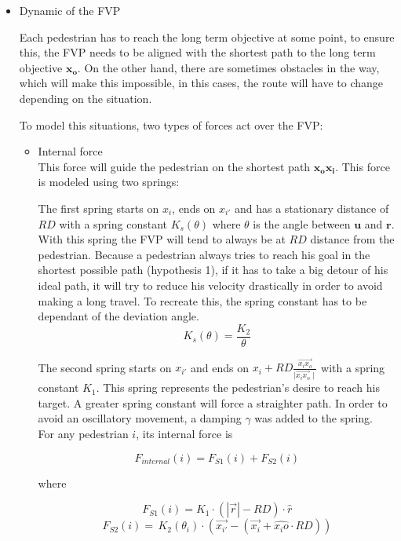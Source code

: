 \documentclass[english]{article}
\begin{document}
\begin{itemize}
\item Dynamic of the FVP

Each pedestrian has to reach the long term objective at some point,
to ensure this, the FVP needs to be aligned with the shortest path
to the long term objective $\mathbf{x_{o}}$. On the other hand, there
are sometimes obstacles in the way, which will make this impossible,
in this cases, the route will have to change depending on the situation.

To model this situations, two types of forces act over the FVP: 
\begin{itemize}
\item Internal force \\

This force will guide the pedestrian on the shortest path $\mathbf{x_{o}x_{i}}$.
This force is modeled using two springs:

The first spring starts on $x_{i}$, ends on $x_{i'}$ and has a stationary
distance of $RD$ with a spring constant $K_{s}(\theta)$ where $\theta$
is the angle between $\mathbf{u}$ and $\mathbf{r}$. With this spring
the FVP will tend to always be at $RD$ distance from the pedestrian.
Because a pedestrian always tries to reach his goal in the shortest
possible path (hypothesis 1), if it has to take a big detour of his
ideal path, it will try to reduce his velocity drastically in order
to avoid making a long travel. To recreate this, the spring constant
has to be dependant of the deviation angle. 
\[
K_{s}(\theta)=\frac{K_{2}}{\theta}
\]

The second spring starts on $x_{i'}$ and ends on $x_{i}+RD\frac{\vec{x_{i}x_{o}}}{\mid\vec{x_{i}x_{o}}\mid}$
with a spring constant $K_{1}$. This spring represents the pedestrian's
desire to reach his target. A greater spring constant will force a
straighter path. In order to avoid an oscillatory movement, a damping
$\gamma$ was added to the spring.\\

For any pedestrian $i$, its internal force is

\begin{equation}
    F_{internal}(i)=F_{S1}(i)+F_{S2}(i)
\end{equation}

where

\[
    F_{S1}(i)=K_{1}\cdot(|\vec{r}|-RD)\cdot\hat{r}
\]
\[
    F_{S2}(i)=\, K_{2}(\theta_{i})\cdot(\vec{x_{i'}}-(\vec{x_{i}}+\hat{x_{i}o}\cdot RD))
\]




\end{itemize}
\end{itemize}
\end{document}
